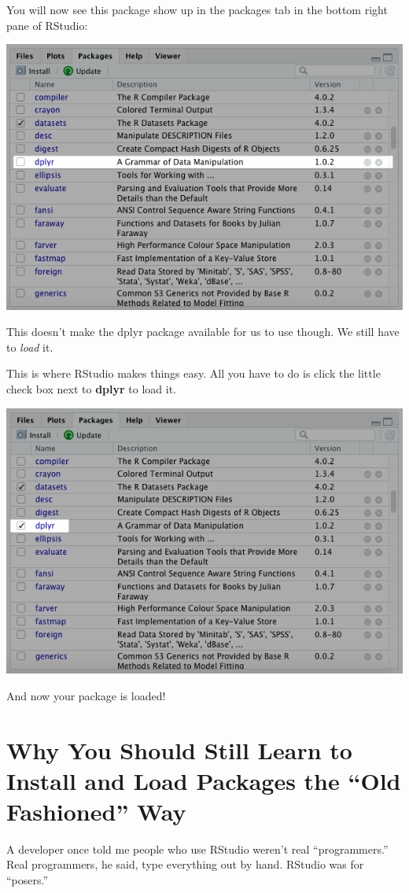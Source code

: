 \documentclass[
]{book}
\begin{document}
\begin{center}
You will now see this package show up in the packages tab in the bottom right pane of RStudio:

\begin{center}\includegraphics[width=0.6\linewidth]{1.40_Dplyr_Package} \end{center}

This doesn't make the dplyr package available for us to use though. We still have to \emph{load} it.

This is where RStudio makes things easy. All you have to do is click the little check box next to \textbf{dplyr} to load it.

\begin{center}\includegraphics[width=0.6\linewidth]{1.41_Dplyr_Loaded} \end{center}

And now your package is loaded!

\hypertarget{why-you-should-still-learn-to-install-and-load-packages-the-old-fashioned-way}{%
\section{Why You Should Still Learn to Install and Load Packages the ``Old Fashioned'' Way}\label{why-you-should-still-learn-to-install-and-load-packages-the-old-fashioned-way}}

A developer once told me people who use RStudio weren't real ``programmers.'' Real programmers, he said, type everything out by hand. RStudio was for ``posers.''


\end{center}
\end{document}

